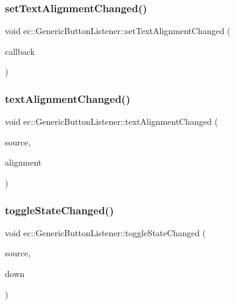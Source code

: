 \subsubsection{\texorpdfstring{set\+Text\+Alignment\+Changed()}{setTextAlignmentChanged()}}
{\footnotesize\ttfamily void ec\+::\+Generic\+Button\+Listener\+::set\+Text\+Alignment\+Changed (\begin{DoxyParamCaption}\item[{const \mbox{\hyperlink{classec_1_1_generic_button_listener_a62ab7e0ca7d7777b9aec72d7f2caf300}{Text\+Alignment\+Changed\+\_\+\+Callback}} \&}]{callback }\end{DoxyParamCaption})}

\mbox{\label{classec_1_1_generic_button_listener_a314ef307095e669783157eeceb452ff6}} 
\subsubsection{\texorpdfstring{text\+Alignment\+Changed()}{textAlignmentChanged()}}
{\footnotesize\ttfamily void ec\+::\+Generic\+Button\+Listener\+::text\+Alignment\+Changed (\begin{DoxyParamCaption}\item[{agui\+::\+Button $\ast$}]{source,  }\item[{agui\+::\+Area\+Alignment\+Enum}]{alignment }\end{DoxyParamCaption})\hspace{0.3cm}{\ttfamily [override]}}

\mbox{\label{classec_1_1_generic_button_listener_a78eb86e35bbc12e5df2f1496ed1cd85c}} 
\subsubsection{\texorpdfstring{toggle\+State\+Changed()}{toggleStateChanged()}}
{\footnotesize\ttfamily void ec\+::\+Generic\+Button\+Listener\+::toggle\+State\+Changed (\begin{DoxyParamCaption}\item[{agui\+::\+Button $\ast$}]{source,  }\item[{bool}]{down }\end{DoxyParamCaption})\hspace{0.3cm}{\ttfamily [override]}}



